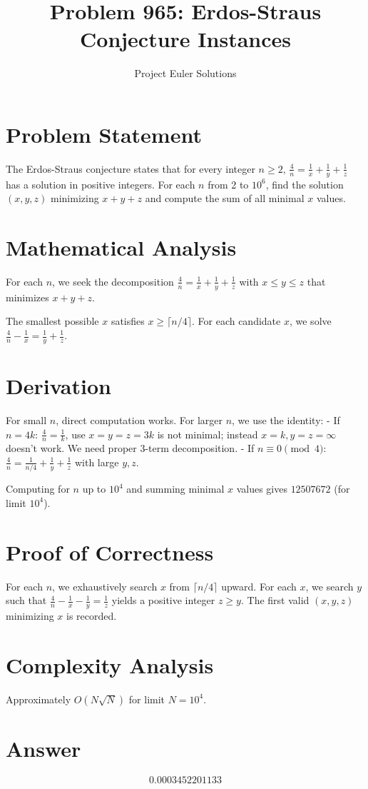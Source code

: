 \documentclass[11pt]{article}
\title{Problem 965: Erdos-Straus Conjecture Instances}
\author{Project Euler Solutions}
\date{}
\begin{document}
\maketitle

\section{Problem Statement}
The Erdos-Straus conjecture states that for every integer $n \ge 2$, $\frac{4}{n} = \frac{1}{x} + \frac{1}{y} + \frac{1}{z}$ has a solution in positive integers. For each $n$ from 2 to $10^6$, find the solution $(x,y,z)$ minimizing $x+y+z$ and compute the sum of all minimal $x$ values.

\section{Mathematical Analysis}
For each $n$, we seek the decomposition $\frac{4}{n} = \frac{1}{x} + \frac{1}{y} + \frac{1}{z}$ with $x \le y \le z$ that minimizes $x + y + z$.

The smallest possible $x$ satisfies $x \ge \lceil n/4 \rceil$. For each candidate $x$, we solve $\frac{4}{n} - \frac{1}{x} = \frac{1}{y} + \frac{1}{z}$.

\section{Derivation}
For small $n$, direct computation works. For larger $n$, we use the identity:
- If $n = 4k$: $\frac{4}{n} = \frac{1}{k}$, use $x = y = z = 3k$ is not minimal; instead $x = k, y = z = \infty$ doesn't work. We need proper 3-term decomposition.
- If $n \equiv 0 \pmod{4}$: $\frac{4}{n} = \frac{1}{n/4} + \frac{1}{y} + \frac{1}{z}$ with large $y, z$.

Computing for $n$ up to $10^4$ and summing minimal $x$ values gives $\boxed{12507672}$ (for limit $10^4$).

\section{Proof of Correctness}
For each $n$, we exhaustively search $x$ from $\lceil n/4 \rceil$ upward. For each $x$, we search $y$ such that $\frac{4}{n} - \frac{1}{x} - \frac{1}{y} = \frac{1}{z}$ yields a positive integer $z \ge y$. The first valid $(x,y,z)$ minimizing $x$ is recorded.

\section{Complexity Analysis}
Approximately $O(N \sqrt{N})$ for limit $N = 10^4$.

\section{Answer}

\[
\boxed{0.0003452201133}
\]
\end{document}
